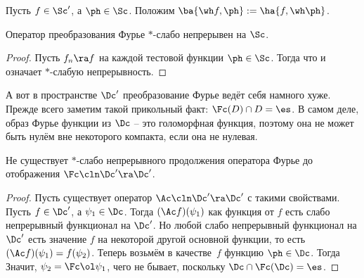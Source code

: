 \documentclass[a4paper]{article}
\newcommand{\dx}{\,dx}
\begin{document}
\begin{df}
Пусть $f\in \Sc'$, а $\ph\in \Sc$. Положим $\ba{\wh f, \ph} := \ha{f, \wh \ph}$.
\end{df}

\begin{stm}
Оператор преобразования Фурье $*$-слабо непрерывен на $\Sc$.
\end{stm}
\begin{proof}
Пусть $f_n\ra f$ на каждой тестовой функции $\ph\in\Sc$. Тогда
что и означает $*$-слабую непрерывность.
\end{proof}

А вот в пространстве $\Dc'$ преобразование Фурье ведёт себя намного хуже. Прежде всего заметим такой прикольный факт:
$\Fc(D) \cap D = \es$. В самом деле, образ Фурье функции из $\Dc$ -- это голоморфная функция, поэтому
она не может быть нулём вне некоторого компакта, если она не нулевая.

\begin{stm}
Не существует $*$-слабо непрерывного продолжения оператора Фурье до отображения $\Fc\cln \Dc'\ra\Dc'$.
\end{stm}
\begin{proof}
Пусть существует оператор $\Ac\cln \Dc'\ra\Dc'$ с такими свойствами. Пусть $f\in \Dc'$, а $\psi_1\in \Dc$.
Тогда $(\Ac f)(\psi_1)$ как функция от $f$ есть слабо непрерывный функционал на $\Dc'$. Но любой слабо непрерывный
функционал на $\Dc'$ есть значение $f$ на некоторой другой основной функции, то есть
$(\Ac f)(\psi_1) = f(\psi_2)$. Теперь возьмём в качестве~$f$ функцию $\ph\in\Dc$. Тогда
\eqn{\int  \psi_2\ph\dx = \int \ol{\ol\psi}_1\Fc\ph\dx = \int \Fc\ol\psi_1\ph\dx.}
Значит, $\psi_2=\Fc\ol\psi_1$, чего не бывает, поскольку $\Dc\cap \Fc(\Dc)=\es$.
\end{proof}
\end{document}
